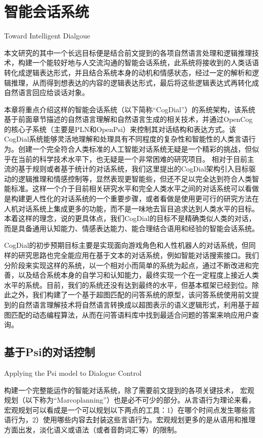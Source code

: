 \chapter{智能会话系统}{Toward Intelligent Dialgoue}

         本文研究的其中一个长远目标便是结合前文提到的各项自然语言处理和逻辑推理技术，构建一个能较好地与人交流沟通的智能会话系统，此系统将接收到的人类话语转化成逻辑表达形式，并且结合系统本身的动机和情感状态，经过一定的解析和逻辑推理，从而得到想表达的内容的逻辑表达形式，最后将这些逻辑表达式再转化成自然语言回应给谈话对象。

       本章将重点介绍这样的智能会话系统（以下简称“CogDial”）的系统架构，该系统基于前面章节描述的自然语言理解和自然语言生成的相关技术，并通过OpenCog的核心子系统（主要是PLN和OpenPsi）来控制其对话结构和表达方式。该CogDial系统能够灵活地理解和处理具有不同程度的复杂性和智能性的人类言语行为。创建一个完全符合人类标准的人工智能对话系统无疑是一个精彩的挑战，但似乎在当前的科学技术水平下，也无疑是一个非常困难的研究项目。 相对于目前主流的基于规则或者基于统计的对话系统，我们这里提出的CogDial架构引入目标驱动的逻辑推理和情感控制等，显然表现更智能些，但还不足以完全达到符合人类智能标准。这样一个介于目前相关研究水平和完全人类水平之间的对话系统可以看做是构建更人性化的对话系统的一个重要步骤，或者看做是使用更可行的研究方法在人机对话系统上集成更多的功能，而不是一味地去盲目追求达到人类水平的目标。本着这样的理念，说的更具体点，我们CogDial的目标不是精确类似人类的对话，而是具备通用认知能力、情感表达能力、能合理结合语用和经验的智能会话系统。

         CogDial的初步预期目标主要是实现面向游戏角色和人性机器人的对话系统，但同样的研究思路也完全能应用在基于文本的对话系统，例如智能对话搜索接口。我们分阶段来实现这样的系统，以一个相对小而简单的系统为起点，通过不断改进和完善，以及结合系统本身的自学习和认知能力，最终实现一个在一定程度上接近人类水平的系统。目前，我们的系统还没有达到最终的水平，但基本框架已经到位。除此之外，我们构建了一个基于超图匹配的问答系统的原型，该问答系统使用前文提到的自然语言理解技术将自然语言转换成以超图表示的语义逻辑形式，利用基于超图匹配的动态编程算法，从而在问答语料库中找到最适合问题的答案来响应用户查询。

\section{基于Psi的对话控制}{Applying the Psi model to Dialogue Control}

构建一个完整能运作的智能对话系统，除了需要前文提到的各项关键技术， 宏观规划（以下称为“Marcoplanning”）也是必不可少的部分。从言语行为理论来看，宏观规划可以看成是一个可以规划以下两点的工具：1）在哪个时间点发生哪些言语行为，2）使用哪些内容去封装这些言语行为。宏观规划更多的是从语用和推理方面出发，淡化语义或语法（或者音韵词汇等）的限制。


